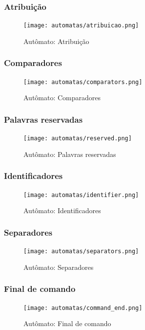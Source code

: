 \subsubsection{Atribuição}
\begin{figure}[H]
\texttt{[image: automatas/atribuicao.png]}
\caption{\label{fig:assignment} Autômato: Atribuição}
\end{figure}

\subsubsection{Comparadores}
\begin{figure}[H]
\texttt{[image: automatas/comparators.png]}
\caption{\label{fig:comparators} Autômato: Comparadores}
\end{figure}

\subsubsection{Palavras reservadas}
\begin{figure}[H]
\texttt{[image: automatas/reserved.png]}
\caption{\label{fig:reserved} Autômato: Palavras reservadas}
\end{figure}

\subsubsection{Identificadores}
\begin{figure}[H]
\texttt{[image: automatas/identifier.png]}
\caption{\label{fig:identifiers} Autômato: Identificadores}
\end{figure}

\subsubsection{Separadores}
\begin{figure}[H]
\texttt{[image: automatas/separators.png]}
\caption{\label{fig:separators} Autômato: Separadores}
\end{figure}

\subsubsection{Final de comando}
\begin{figure}[H]
\texttt{[image: automatas/command\_end.png]}
\caption{\label{fig:command_end} Autômato: Final de comando}
\end{figure}

